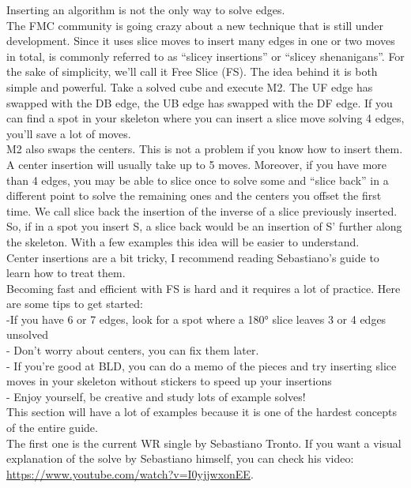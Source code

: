 \documentclass[11pt,a4paper]{book}
\begin{document}
Inserting an algorithm is not the only way to solve edges.\\
\newline
The FMC community is going crazy about a new technique that is still under development. Since it uses slice moves to insert many edges in one or two moves in total, is commonly referred to as “slicey insertions” or “slicey shenanigans”. For the sake of simplicity, we’ll call it Free Slice (FS). The idea behind it is both simple and powerful. Take a solved cube and execute M2. The UF edge has swapped with the DB edge, the UB edge has swapped with the DF edge. If you can find a spot in your skeleton where you can insert a slice move solving 4 edges, you’ll save a lot of moves.\\
M2 also swaps the centers. This is not a problem if you know how to insert them. A center insertion will usually take up to 5 moves. Moreover, if you have more than 4 edges, you may be able to slice once to solve some and “slice back” in a different point to solve the remaining ones and the centers you offset the first time. We call slice back the insertion of the inverse of a slice previously inserted. So, if in a spot you insert S, a slice back would be an insertion of S’ further along the skeleton. With a few examples this idea will be easier to understand.\\
\newline
Center insertions are a bit tricky, I recommend reading Sebastiano’s guide to learn how to treat them.\\
\newline
Becoming fast and efficient with FS is hard and it requires a lot of practice. Here are some tips to get started:\\
-If you have 6 or 7 edges, look for a spot where a 180° slice leaves 3 or 4 edges unsolved\\
- Don’t worry about centers, you can fix them later.\\
- If you’re good at BLD, you can do a memo of the pieces and try inserting slice moves in your skeleton without stickers to speed up your insertions \\
- Enjoy yourself, be creative and study lots of example solves!\\
\newline
This section will have a lot of examples because it is one of the hardest concepts of the entire guide.\\
\newline
The first one is the current WR single by Sebastiano Tronto. If you want a visual explanation of the solve by Sebastiano himself, you can check his video: 
\url{ https://www.youtube.com/watch?v=I0yjjwxonEE}.
\end{document}
